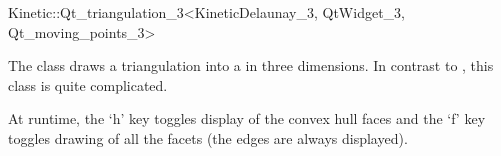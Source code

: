 

\begin{ccRefClass}{Kinetic::Qt_triangulation_3<KineticDelaunay_3, QtWidget_3, Qt_moving_points_3>}  %


\ccDefinition
  
The class draws a triangulation into a  in three
dimensions. In contrast to
, this class is quite complicated.

At runtime, the `h' key toggles display of the convex hull faces and
the `f' key toggles drawing of all the facets (the edges are always
displayed).


\ccCreation
{}  %



\end{ccRefClass}


